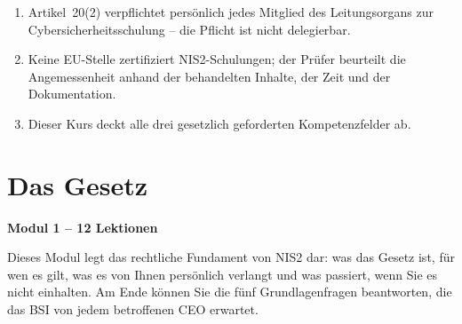 \documentclass[11pt,a4paper,twoside]{book}
\begin{document}
\begin{keytakeaways}
\begin{enumerate}
  \item Artikel~20(2) verpflichtet persönlich jedes Mitglied des Leitungsorgans zur Cybersicherheitsschulung -- die Pflicht ist nicht delegierbar.
  \item Keine EU-Stelle zertifiziert NIS2-Schulungen; der Prüfer beurteilt die Angemessenheit anhand der behandelten Inhalte, der Zeit und der Dokumentation.
  \item Dieser Kurs deckt alle drei gesetzlich geforderten Kompetenzfelder ab.
\end{enumerate}
\end{keytakeaways}

\newpage


\chapter{Das Gesetz}

\begin{moduleintro}
\textbf{Modul 1 -- 12 Lektionen}

Dieses Modul legt das rechtliche Fundament von NIS2 dar: was das Gesetz ist, für wen es gilt, was es von Ihnen persönlich verlangt und was passiert, wenn Sie es nicht einhalten. Am Ende können Sie die fünf Grundlagenfragen beantworten, die das BSI von jedem betroffenen CEO erwartet.
\end{moduleintro}

\bigskip
\end{document}
